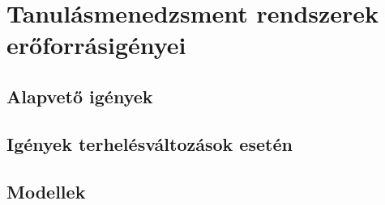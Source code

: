 \chapter{Tanulásmenedzsment rendszerek erőforrásigényei}
\section{Alapvető igények}
\section{Igények terhelésváltozások esetén}
\section{Modellek}
